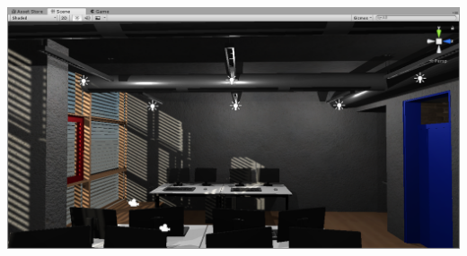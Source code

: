 \begin{center}
\noindent\includegraphics[width=14cm]{tex/img/ch05/UnitySceneA205_02.png}
\label{fig:unity-scene-a205}
\end{center}

